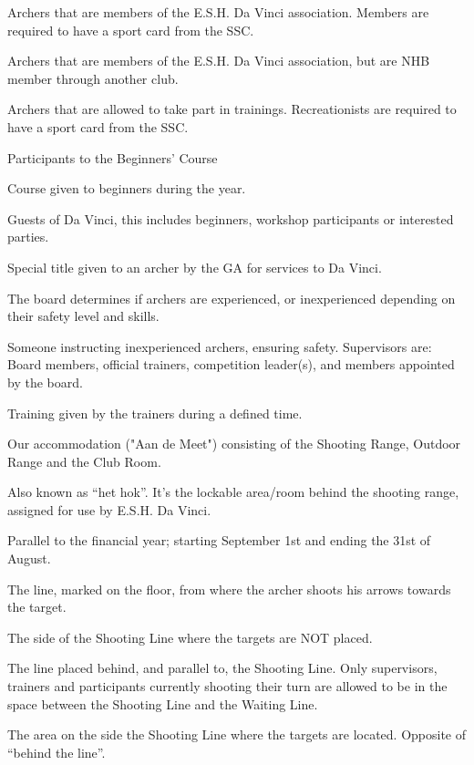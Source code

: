 \documentclass[a4paper]{article}
\begin{document}
\begin{description}[font=\sffamily\bfseries, leftmargin=1cm, style=nextline]
\item[Member]
Archers that are members of the E.S.H. Da Vinci association. Members are required to have a sport card from the SSC.
\item[External Member]
Archers that are members of the E.S.H. Da Vinci association, but are NHB member through another club.
\item[Recreationist]
Archers that are allowed to take part in trainings. Recreationists are required to have a sport card from the SSC.
\item[Beginner]
Participants to the Beginners' Course
\item[Beginners' Course] Course given to beginners during the year.
\item[Guest] Guests of Da Vinci, this includes beginners, workshop participants or interested parties.
\item[Honorary Member] Special title given to an archer by the GA for services to Da Vinci.
\item[Experienced - Inexperienced] The board determines if archers are experienced, or inexperienced depending on their safety level and skills.
\item[Supervisor] Someone instructing inexperienced archers, ensuring safety. Supervisors are: Board members, official trainers, competition leader(s), and members appointed by the board.
\item[General Training] Training given by the trainers during a defined time.

\item[Accommodation] Our accommodation ("Aan de Meet") consisting of the Shooting Range, Outdoor Range and the Club Room.
\item[Club Room] Also known as “het hok”. It’s the lockable area/room behind the shooting range, assigned for use by E.S.H. Da Vinci.
    \item[Association Year]
    Parallel to the financial year; starting September 1st and ending the 31st of August. 
    
    \item[Shooting Line]
    The line, marked on the floor, from where the archer shoots his arrows towards the target.
    \item[“Behind the line”]
    The side of the Shooting Line where the targets are NOT placed. 
    \item[Waiting Line]
The line placed behind, and parallel to, the Shooting Line. Only supervisors, trainers and participants currently shooting their turn are allowed to be in the space between the Shooting Line and the Waiting Line. 


\item[Downrange of the Line] The area on the side the Shooting Line where the targets are located. Opposite of ``behind the line''.

\end{description}
\end{document}
